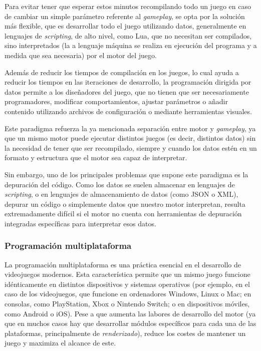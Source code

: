 \smallskip

Para evitar tener que esperar estos minutos recompilando todo un juego en caso de cambiar un simple parámetro referente al \textit{gameplay}, se opta por la solución más flexible, que es desarrollar todo el juego utilizando datos, generalmente en lenguajes de \textit{scripting}, de alto nivel, como Lua, que no necesitan ser compilados, sino interpretados (la  a lenguaje máquina se realiza en ejecución del programa y a medida que sea necesaria) por el motor del juego.

\medskip

Además de reducir los tiempos de compilación en los juegos, lo cual ayuda a reducir los tiempos en las iteraciones de desarrollo, la programación dirigida por datos permite a los diseñadores del juego, que no tienen que ser necesariamente programadores, modificar comportamientos, ajustar parámetros o añadir contenido utilizando archivos de configuración o mediante herramientas visuales.

\medskip

Este paradigma refuerza la ya mencionada separación entre motor y \textit{gameplay}, ya que un mismo motor puede ejecutar distintos juegos (es decir, distintos datos) sin la necesidad de tener que ser recompilado, siempre y cuando los datos estén en un formato y estructura que el motor sea capaz de interpretar.

\medskip

Sin embargo, uno de los principales problemas que supone este paradigma es la depuración del código. Como los datos se suelen almacenar en lenguajes de \textit{scripting}, o en lenguajes de almacenamiento de datos (como JSON o XML), depurar un código o simplemente datos que nuestro motor interpretan, resulta extremadamente difícil si el motor no cuenta con herramientas de depuración integradas específicas para interpretar esos datos.

\subsubsection{Programación multiplataforma}
La programación multiplataforma es una práctica esencial en el desarrollo de videojuegos modernos. Esta característica permite que un mismo juego funcione idénticamente en distintos dispositivos y sistemas operativos (por ejemplo, en el caso de los videojuegos, que funcione en ordenadores Windows, Linux o Mac; en consolas, como PlayStation, Xbox o Nintendo Switch; o en dispositivos móviles, como Android o iOS). Pese a que aumenta las labores de desarrollo del motor (ya que en muchos casos hay que desarrollar módulos específicos para cada una de las plataformas, principalmente de \textit{renderizado}), reduce los costes de mantener un juego y maximiza el alcance de este.

